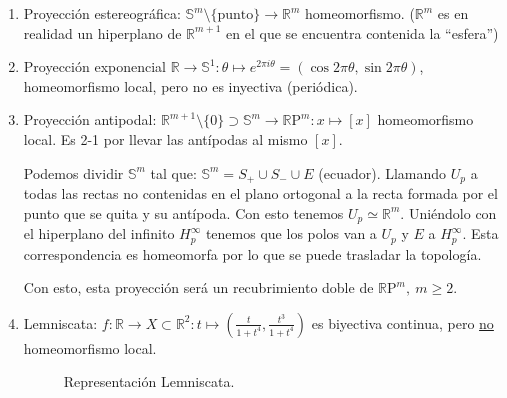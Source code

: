 \begin{ej}[¡Importantes!]
\begin{enumerate}
    \item Proyección estereográfica: $\mathbb{S}^{m} \setminus \{\text{punto}\} \rightarrow \mathbb{R}^m$ homeomorfismo. ($\mathbb{R}^{m}$ es en realidad un hiperplano de $\mathbb{R}^{m+1}$ en el que se encuentra contenida la ``esfera'')

    \item Proyección exponencial $\mathbb{R} \rightarrow \mathbb{S}^1: \theta \mapsto e^{2\pi i\theta} = \left( \cos 2\pi \theta, \sin 2\pi \theta \right)$, homeomorfismo local, pero no es inyectiva (periódica).

    \item Proyección antipodal: $\mathbb{R}^{m+1}\setminus \{0\} \supset \mathbb{S}^m \rightarrow \mathbb{R}\mathrm{P}^{m}: x \mapsto \left[ x \right]$ homeomorfismo local. Es 2-1 por llevar las antípodas al mismo $\left[ x \right]$. 

    Podemos dividir $\mathbb{S}^{m}$ tal que: $\mathbb{S}^{m} = S_{+} \cup S_{-} \cup E$ (ecuador). Llamando $U_p$ a todas las rectas no contenidas en el plano ortogonal a la recta formada por el punto que se quita y su antípoda. Con esto tenemos $U_p \simeq \mathbb{R}^{m}$. Uniéndolo con el hiperplano del infinito $H_p^{\infty}$ tenemos que los polos van a $U_p$ y $E$ a $H_p^{\infty}$. Esta correspondencia es homeomorfa por lo que se puede trasladar la topología.

    Con esto, esta proyección será un recubrimiento doble de $\mathbb{R}\mathrm{P}^m,\ m \ge 2$.

    \item Lemniscata: $f: \mathbb{R} \rightarrow X \subset \mathbb{R}^2: t \mapsto \left( \frac{t}{1 + t^4}, \frac{t^3}{1 + t^4} \right)$ es biyectiva continua, pero \underline{no} homeomorfismo local.

    \begin{figure}[H]
        \centering
        \caption{Representación Lemniscata.}
        \label{fig:lemniscata}
    \end{figure}


\end{enumerate}
\end{ej}
